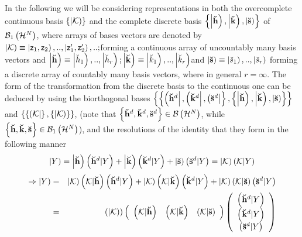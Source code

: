 In the following we will be considering representations in both the
overcomplete continuous basis $\left\{ \left| {\cal K}\right) \right\} $ and
the complete discrete basis $\left\{ \left| {\bf \breve{h}}\right) ,\left| 
{\bf \breve{k}}\right) ,\left| {\bf \breve{s}}\right) \right\} $ of ${\cal B}%
_{1}\left( {\cal H}^{N}\right) $, where arrays of bases vectors are denoted
by $\left| {\cal K}\right) \equiv \left| {\sf z}_{1},{\sf z}_{2}\right)
,..,\left| {\sf z}_{1}^{\prime },{\sf z}_{2}^{\prime }\right) ,..;$forming a
continuous array of uncountably many basis vectors and $\left| {\bf \breve{h}%
}\right) \equiv \left| \breve{h}_{1}\right) ,..,\left| \breve{h}_{r}\right)
;\left| {\bf \breve{k}}\right) \equiv \left| \breve{k}_{1}\right) ,..,\left| 
\breve{k}_{r}\right) $and $\left| {\bf \breve{s}}\right) \equiv \left| 
\breve{s}_{1}\right) ,..,\left| \breve{s}_{r}\right) $ forming a discrete
array of countably many basis vectors, where in general $r=\infty $. The
form of the transformation from the discrete basis to the continuous one can
be deduced by using the biorthogonal bases $\left\{ \left\{ \left( {\bf 
\breve{h}}^{d}\right| ,\left( {\bf \breve{k}}^{d}\right| ,\left( {\bf \breve{%
s}}^{d}\right| \right\} ,\left\{ \left| {\bf \breve{h}}\right) ,\left| {\bf 
\breve{k}}\right) ,\left| {\bf \breve{s}}\right) \right\} \right\} $ and $%
\left\{ \left\{ \left( {\cal K}\right| \right\} ,\left\{ \left| {\cal K}%
\right) \right\} \right\} $, (note that $\left\{ {\bf \breve{h}}^{d},{\bf 
\breve{k}}^{d},{\bf \breve{s}}^{d}\right\} \in {\cal B}\left( {\cal H}%
^{N}\right) $, while $\left\{ {\bf \breve{h}},{\bf \breve{k}},{\bf \breve{s}}%
\right\} \in {\cal B}_{1}\left( {\cal H}^{N}\right) $), and the resolutions
of the identity that they form in the following manner 
\begin{equation}
\left| Y\right) =\left| {\bf \breve{h}}\right) \left( {\bf \breve{h}}%
^{d}|Y\right) +\left| {\bf \breve{k}}\right) \left( {\bf \breve{k}}%
^{d}|Y\right) +\left| {\bf \breve{s}}\right) \left( {\bf \breve{s}}%
^{d}|Y\right) =\left| {\cal K}\right) \left( {\cal K}|Y\right)
\end{equation}%
\begin{eqnarray}
\Rightarrow \left| Y\right) &=&\left| {\cal K}\right) \left( {\cal K}|{\bf 
\breve{h}}\right) \left( {\bf \breve{h}}^{d}|Y\right) +\left| {\cal K}%
\right) \left( {\cal K}|{\bf \breve{k}}\right) \left( {\bf \breve{k}}%
^{d}|Y\right) +\left| {\cal K}\right) \left( {\cal K}|{\bf \breve{s}}\right)
\left( {\bf \breve{s}}^{d}|Y\right)  \nonumber \\
&=&\left( \left| {\cal K}\right) \right) \left( 
\begin{array}{ccc}
\left( {\cal K}|{\bf \breve{h}}\right) & \left( {\cal K}|{\bf \breve{k}}%
\right) & \left( {\cal K}|{\bf \breve{s}}\right)%
\end{array}%
\right) \left( 
\begin{array}{c}
\left( {\bf \breve{h}}^{d}|Y\right) \\ 
\left( {\bf \breve{k}}^{d}|Y\right) \\ 
\left( {\bf \breve{s}}^{d}|Y\right)%
\end{array}%
\right)  \label{KtoH}
\end{eqnarray}%
